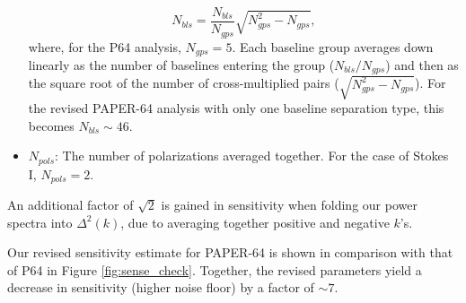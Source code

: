 \documentclass[preprint2,numberedappendix,tighten]{aastex6}  %
\begin{document}
\begin{itemize}
\begin{equation}
N_{bls} = \frac{N_{bls}}{N_{gps}}\sqrt{N_{gps}^{2}-N_{gps}},
\end{equation}
\noindent where, for the P64 analysis, $N_{gps} = 5$. Each baseline group averages down linearly as the number of baselines entering the group ($N_{bls}/N_{gps}$) and then as the square root of the number of cross-multiplied pairs ($\sqrt{N_{gps}^{2} - N_{gps}}$). For the revised PAPER-64 analysis with only one baseline separation type, this becomes $N_{bls} \sim 46$. 
\item $N_{pols}$: The number of polarizations averaged together. For the case of Stokes I, $N_{pols}=2$.
\end{itemize}

An additional factor of $\sqrt{2}$ is gained in sensitivity when folding our power spectra into $\Delta^{2}(k)$, due to averaging together positive and negative $k$'s. 

Our revised sensitivity estimate for PAPER-64 is shown in comparison with that of P64 in Figure \ref{fig:sense_check}. Together, the revised parameters yield a decrease in sensitivity (higher noise floor) by a factor of $\sim7$. 
\end{document}
